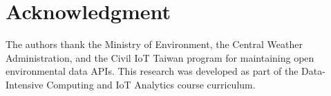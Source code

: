 \documentclass[conference]{IEEEtran}
\begin{document}
\section*{Acknowledgment}
The authors thank the Ministry of Environment, the Central Weather Administration, and the Civil IoT Taiwan program for maintaining open environmental data APIs. This research was developed as part of the Data-Intensive Computing and IoT Analytics course curriculum.



\end{document}
